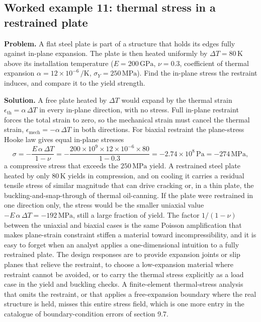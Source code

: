 \subsection*{Worked example 11: thermal stress in a restrained plate}

\textbf{Problem.} A flat steel plate is part of a structure that holds
its edges fully against in-plane expansion. The plate is then heated
uniformly by $\Delta T = 80\,\si{\kelvin}$ above its installation temperature
($E = 200\,\text{GPa}$, $\nu = 0.3$, coefficient of thermal expansion
$\alpha = 12\times 10^{-6}\,\si{\per\kelvin}$, $\sigma_Y = 250\,\text{
MPa}$). Find the in-plane stress the restraint induces, and compare it to
the yield strength.

\textbf{Solution.} A free plate heated by $\Delta T$ would expand by the
thermal strain $\epsilon_{\text{th}} = \alpha\,\Delta T$ in every
in-plane direction, with no stress. Full in-plane restraint forces the
total strain to zero, so the mechanical strain must cancel the thermal
strain, $\epsilon_{\text{mech}} = -\alpha\,\Delta T$ in both directions.
For biaxial restraint the plane-stress Hooke law gives equal in-plane
stresses
\[
\sigma = -\frac{E\,\alpha\,\Delta T}{1-\nu}
= -\frac{200\times 10^9 \times 12\times 10^{-6}\times 80}{1-0.3}
= -2.74\times 10^8\,\text{Pa} = -274\,\text{MPa},
\]
a compressive stress that exceeds the $250\,\text{MPa}$ yield. A
restrained steel plate heated by only $80\,\si{\kelvin}$ yields in compression,
and on cooling it carries a residual tensile stress of similar
magnitude that can drive cracking or, in a thin plate, the
buckling-and-snap-through of thermal oil-canning. If the plate were
restrained in one direction only, the stress would be the smaller
uniaxial value $-E\,\alpha\,\Delta T = -192\,\text{MPa}$, still a large
fraction of yield. The factor $1/(1-\nu)$ between the uniaxial and
biaxial cases is the same Poisson amplification that makes plane-strain
constraint stiffen a material toward incompressibility, and it is easy to
forget when an analyst applies a one-dimensional intuition to a fully
restrained plate. The design responses are to provide expansion joints
or slip planes that relieve the restraint, to choose a low-expansion
material where restraint cannot be avoided, or to carry the thermal
stress explicitly as a load case in the yield and buckling checks. A
finite-element thermal-stress analysis that omits the restraint, or that
applies a free-expansion boundary where the real structure is held,
misses this entire stress field, which is one more entry in the
catalogue of boundary-condition errors of section 9.7.

